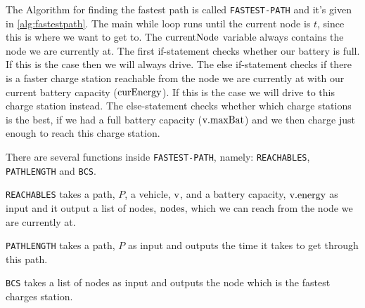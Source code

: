 The Algorithm for finding the fastest path is called \texttt{FASTEST-PATH} and it's given in \ref{alg:fastestpath}.
The main while loop runs until the current node is $t$, since this is where we want to get to. The
$\textnormal{currentNode}$ variable always contains the node we are currently at. The first if-statement checks 
whether our battery is full. If this is the case then we will always drive. The else if-statement checks if there 
is a faster charge station reachable from the node we are currently at with our current battery capacity
($\textnormal{curEnergy}$). If this is the case we will drive to this charge station instead. The else-statement
checks whether which charge stations is the best, if we had a full battery capacity ($\textnormal{v.maxBat}$) and
we then charge just enough to reach this charge station.

There are several functions inside \texttt{FASTEST-PATH}, namely: \texttt{REACHABLES}, \texttt{PATHLENGTH} and 
\texttt{BCS}. 

\texttt{REACHABLES} takes a path, $P$, a vehicle, $\textnormal{v}$, and a battery capacity, 
$\textnormal{v.energy}$ as input and it output a list of nodes, $\textnormal{nodes}$, which we can reach from 
the node we are currently at. 

\texttt{PATHLENGTH} takes a path, $P$ as input and outputs the time it takes to get through this path.

\texttt{BCS} takes a list of nodes as input and outputs the node which is the fastest charges station. 
  
